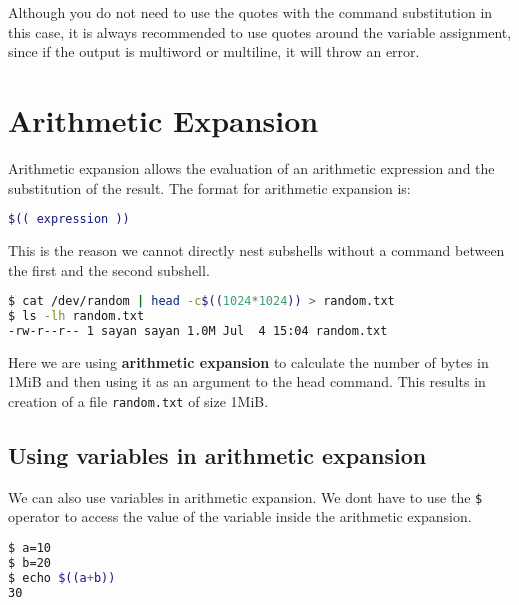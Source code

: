 \begin{remark}
  Although you do not need to use the quotes with the command substitution
  in this case, it is always recommended to use quotes around the variable
  assignment, since if the output is multiword or multiline, it will
  throw an error.
\end{remark}

\section{Arithmetic Expansion}

Arithmetic expansion allows the evaluation of an arithmetic
expression and the substitution of the result. The format for
arithmetic expansion is:

\begin{lstlisting}[language=bash]
$(( expression ))
\end{lstlisting}

This is the reason we cannot directly nest subshells without a
command between the first and the second subshell.

\begin{lstlisting}[language=bash]
$ cat /dev/random | head -c$((1024*1024)) > random.txt
$ ls -lh random.txt
-rw-r--r-- 1 sayan sayan 1.0M Jul  4 15:04 random.txt
\end{lstlisting}

Here we are using \textbf{arithmetic expansion} to calculate the
number of bytes in 1MiB
and then using it as an argument to the head command.
This results in creation of a file \lstinline|random.txt| of size 1MiB.

\subsection{Using variables in arithmetic expansion}

We can also use variables in arithmetic expansion.
We dont have to use the \lstinline|$| operator to access the value of
the variable inside the arithmetic expansion.

\begin{lstlisting}[language=bash]
$ a=10
$ b=20
$ echo $((a+b))
30
\end{lstlisting}

